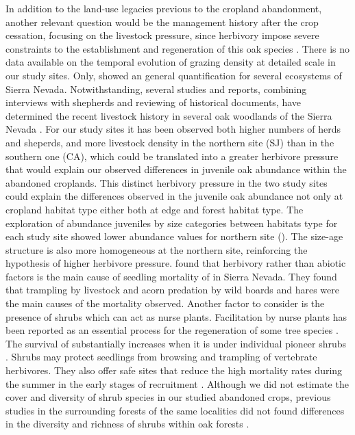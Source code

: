 In addition to the land-use legacies previous to the cropland abandonment, another relevant question would be the management history after the crop cessation, focusing on the livestock pressure, since herbivory impose severe constraints to the establishment and regeneration of this oak species \autocites{Gomez2003ImpactVertebrate, Pereaetal2014InteraccionesPlantaanimal}. There is no data available on the temporal evolution of grazing density at detailed scale in our study sites. Only, \citet{RoblesCruz2008ConjuntoSierras} showed an general quantification for several ecosystems of Sierra Nevada. Notwithstanding, several studies and reports, combining interviews with shepherds and reviewing of historical documents, have determined the recent livestock history in several oak woodlands of the Sierra Nevada \autocites{MorenoLlorcaetal2016HistoricalAnalysis, MorenoLlorcaetal2014CaracterizacionFuentes,MorenoLlorcaZamora2012CaracterizacionCarga}. For our study sites it has been observed both higher numbers of herds and sheperds, and more livestock density in the northern site (SJ) than in the southern one (CA), which could be translated into a greater herbivore pressure that would explain our observed differences in juvenile oak abundance within the abandoned croplands. This distinct herbivory pressure in the two study sites could explain the differences observed in the juvenile oak abundance not only at cropland habitat type either both at edge and forest habitat type. The exploration of abundance juveniles by size categories between habitats type for each study site showed lower abundance values for northern site (). The size-age structure is also more homogeneous at the northern site, reinforcing the hypothesis of higher herbivore pressure. \citet{Gomez2003ImpactVertebrate} found that herbivory rather than abiotic factors is the main cause of seedling mortality of \Qp in Sierra Nevada. They found that trampling by livestock and acorn predation by wild boards and hares were the main causes of the mortality observed. Another factor to consider is the presence of shrubs which can act as nurse plants. Facilitation by nurse plants has been reported as an essential process for the regeneration of some tree species  \autocites{Castroetal2006RestoringQuercus,GomezAparicioetal2004ApplyingPlant}. The survival of \Qp substantially increases when it is under individual pioneer shrubs \autocite{Castroetal2006RestoringQuercus,Costaetal2017CanNative}. Shrubs may protect \Qp seedlings from browsing and trampling of vertebrate herbivores. They also offer safe sites that reduce the high mortality rates during the summer in the early stages of recruitment \autocites{Castroetal2006RestoringQuercus,Barazaetal2004HerbivoryHas}. Although we did not estimate the cover and diversity of shrub species in our studied abandoned crops, previous studies in the surrounding forests of the same localities did not found differences in the diversity and richness of shrubs within oak forests \autocite{Munoz2012BosquesAutoctonos}. 

